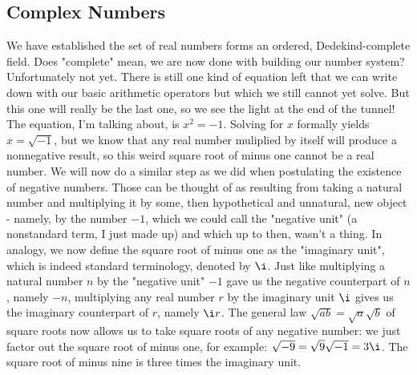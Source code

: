 



\subsection{Complex Numbers}
We have established the set of real numbers forms an ordered, Dedekind-complete field. Does "complete" mean, we are now done with building our number system? Unfortunately not yet. There is still one kind of equation left that we can write down with our basic arithmetic operators but which we still cannot yet solve. But this one will really be the last one, so we see the light at the end of the tunnel! The equation, I'm talking about, is $x^2 = -1$. Solving for $x$ formally yields $x = \sqrt{-1}$, but we know that any real number muliplied by itself will produce a nonnegative result, so this weird square root of minus one cannot be a real number. We will now do a similar step as we did when postulating the existence of negative numbers. Those can be thought of as resulting from taking a natural number and multiplying it by some, then hypothetical and unnatural, new object - namely, by the number $-1$, which we could call the "negative unit" (a nonstandard term, I just made up) and which up to then, wasn't a thing. In analogy, we now define the square root of minus one as the "imaginary unit", which is indeed standard terminology, denoted by $\i$. Just like multiplying a natural number $n$ by the "negative unit" $-1$ gave us the negative counterpart of $n$, namely $-n$, multiplying any real number $r$ by the imaginary unit $\i$ gives us the imaginary counterpart of $r$, namely $\i r$. The general law $\sqrt{a b} = \sqrt{a} \sqrt{b}$ of square roots now allows us to take square roots of any negative number: we just factor out the square root of minus one, for example: $\sqrt{-9} = \sqrt{9} \sqrt{-1} = 3 \i$. The square root of minus nine is three times the imaginary unit.

